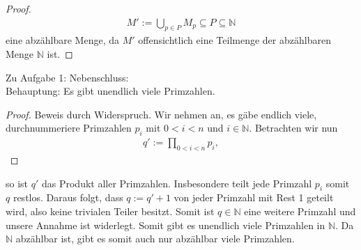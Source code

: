 \documentclass{scrreprt}
\newcommand{\NN}{\mathbb{N}}
\begin{document}
\begin{enumerate}[(a)]
\begin{proof}
				\begin{align*}
					M' := \bigcup\limits_{p \in P} M_p \subseteq P \subseteq \NN
				\end{align*}
				eine abzählbare Menge, da $M'$ offensichtlich eine Teilmenge der abzählbaren Menge $\NN$ ist.
			\end{proof}
	\end{enumerate}
	\pagebreak
	Zu Aufgabe 1: Nebenschluss:\\
	Behauptung: Es gibt unendlich viele Primzahlen.
	\begin{proof}
		Beweis durch Widerspruch. Wir nehmen an, es gäbe endlich viele, durchnummeriere Primzahlen $p_i$ mit $0 < i < n$ und $i \in \NN$. Betrachten wir nun
		\begin{align*}
			q' := \prod\limits_{0 < i < n} p_i,
		\end{align*}
	\end{proof}
	so ist $q'$ das Produkt aller Primzahlen. Insbesondere teilt jede Primzahl $p_i$ somit $q$ restlos. Daraus folgt, dass $q := q' + 1$ von jeder Primzahl mit Rest 1 geteilt wird, also keine trivialen Teiler besitzt. Somit ist $q \in \NN$ eine weitere Primzahl und unsere Annahme ist widerlegt. Somit gibt es unendlich viele Primzahlen in $\NN$. Da $\NN$ abzählbar ist, gibt es somit auch nur abzählbar viele Primzahlen.
		
\end{document}
